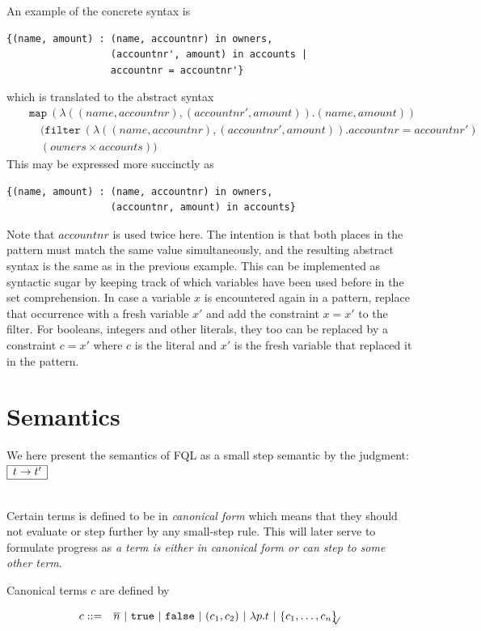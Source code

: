 \documentclass[a4paper]{article}
\newcommand{\buzz}[1]{{\sl #1}}
\newcommand{\pipe}{\ | \ }
\newcommand{\s}[1]{\mathtt{#1}}
\newcommand{\sn}{\overline{n}}
\newcommand{\sLb}{\s{\{}}
\newcommand{\sRb}{\s{\}}}
\newcommand{\strue}{\s{true}}
\newcommand{\sfalse}{\s{false}}
\newcommand{\sset}[1]{\sLb #1 \sRb}
\newcommand{\ssetc}[1]{\sset{#1}_{\!\!\!\surd}}
\newcommand{\step}{\to}
\newcommand{\smbox}[1]{
  $\begin{array}{|c|}
    \hline
    #1 \\
    \hline
  \end{array}$
}
\begin{document}
An example of the concrete syntax is
\begin{verbatim}
{(name, amount) : (name, accountnr) in owners,
                  (accountnr', amount) in accounts |
                  accountnr = accountnr'}
\end{verbatim}
which is translated to the abstract syntax
\begin{eqnarray*}
&&\s{map\ } (\lambda ((name, accountnr), (accountnr', amount)). (name, amount))\\
&&\quad(\s{filter\ } (\lambda ((name, accountnr), (accountnr', amount)). accountnr = accountnr')\\
&&\quad(owners \times accounts))
\end{eqnarray*}
This may be expressed more succinctly as
\begin{verbatim}
{(name, amount) : (name, accountnr) in owners,
                  (accountnr, amount) in accounts}
\end{verbatim}
Note that $accountnr$ is used twice here. The intention is that
both places in the pattern must match the same value
simultaneously, and the resulting abstract syntax is the same as
in the previous example. This can be implemented as syntactic sugar
by keeping track of which variables have been used before in the
set comprehension. In case a variable $x$ is encountered again in a
pattern, replace that occurrence with a fresh variable $x'$ and add
the constraint $x = x'$ to
the filter. For booleans, integers and other literals, they too can
be replaced by a constraint $c = x'$ where $c$ is the literal and
$x'$ is the fresh variable that replaced it in the pattern.



\section{Semantics}
\label{sec:semantics}

We here present the semantics of FQL as a small step semantic by the judgment: \smbox{t \step t'}
\\

Certain terms is defined to be in \buzz{canonical form} which means
that they should not evaluate or step further by any small-step
rule. This will later serve to formulate progress as \buzz{ a term is
  either in canonical form or can step to some other term}.  

Canonical terms $c$ are defined by

\begin{eqnarray*}
c & ::= & \sn \pipe \strue \pipe \sfalse \pipe (c_1, c_2) \pipe \lambda
p.t \pipe \ssetc{c_1,\ldots,c_n}
\end{eqnarray*}
\end{document}
